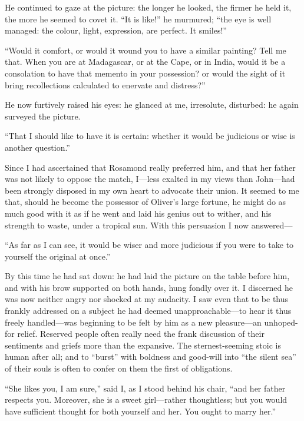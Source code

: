 He continued to gaze at the picture: the longer he looked, the firmer he
held it, the more he seemed to covet it. \enquote{It is like!} he
murmured; \enquote{the eye is well managed: the colour, light,
expression, are perfect. It smiles!}

\enquote{Would it comfort, or would it wound you to have a similar
painting? Tell me that. When you are at Madagascar, or at the Cape, or
in India, would it be a consolation to have that memento in your
possession? or would the sight of it bring recollections calculated to
enervate and distress?}

He now furtively raised his eyes: he glanced at me, irresolute,
disturbed: he again surveyed the picture.

\enquote{That I should like to have it is certain: whether it would be
judicious or wise is another question.}

Since I had ascertained that Rosamond really preferred him, and that her
father was not likely to oppose the match, I---less exalted in my views
than \St{} John---had been strongly disposed in my own heart to advocate
their union. It seemed to me that, should he become the possessor of
\Mr{} Oliver's large fortune, he might do as much good with it as if he
went and laid his genius out to wither, and his strength to waste, under
a tropical sun. With this persuasion I now answered---

\enquote{As far as I can see, it would be wiser and more judicious if
you were to take to yourself the original at once.}

By this time he had sat down: he had laid the picture on the table
before him, and with his brow supported on both hands, hung fondly over
it. I discerned he was now neither angry nor shocked at my audacity. I
saw even that to be thus frankly addressed on a subject he had deemed
unapproachable---to hear it thus freely handled---was beginning to be
felt by him as a new pleasure---an unhoped-for relief. Reserved people
often really need the frank discussion of their sentiments and griefs
more than the expansive. The sternest-seeming stoic is human after all;
and to \enquote{burst} with boldness and good-will into \enquote{the
silent sea} of their souls is often to confer on them the first of
obligations.

\enquote{She likes you, I am sure,} said I, as I stood behind his chair,
\enquote{and her father respects you. Moreover, she is a sweet
girl---rather thoughtless; but you would have sufficient thought for
both yourself and her. You ought to marry her.}

